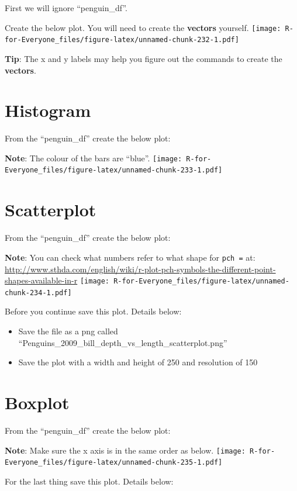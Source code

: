 \documentclass[]{book}
\providecommand{\tightlist}{%
  \setlength{\itemsep}{0pt}\setlength{\parskip}{0pt}}
\begin{document}
First we will ignore ``penguin\_df''.

Create the below plot. You will need to create the \textbf{vectors}
yourself.
\texttt{[image: R-for-Everyone\_files/figure-latex/unnamed-chunk-232-1.pdf]}

\textbf{Tip}: The x and y labels may help you figure out the commands to
create the \textbf{vectors}.

\section{Histogram}\label{histogram}

From the ``penguin\_df'' create the below plot:

\textbf{Note}: The colour of the bars are ``blue''.
\texttt{[image: R-for-Everyone\_files/figure-latex/unnamed-chunk-233-1.pdf]}

\section{Scatterplot}\label{scatterplot}

From the ``penguin\_df'' create the below plot:

\textbf{Note}: You can check what numbers refer to what shape for
\texttt{pch\ =} at:
\url{http://www.sthda.com/english/wiki/r-plot-pch-symbols-the-different-point-shapes-available-in-r}
\texttt{[image: R-for-Everyone\_files/figure-latex/unnamed-chunk-234-1.pdf]}

Before you continue save this plot. Details below:

\begin{itemize}
\tightlist
\item
  Save the file as a png called
  ``Penguins\_2009\_bill\_depth\_vs\_length\_scatterplot.png''
\item
  Save the plot with a width and height of 250 and resolution of 150
\end{itemize}

\section{Boxplot}\label{boxplot}

From the ``penguin\_df'' create the below plot:

\textbf{Note}: Make sure the x axis is in the same order as below.
\texttt{[image: R-for-Everyone\_files/figure-latex/unnamed-chunk-235-1.pdf]}

For the last thing save this plot. Details below:
\end{document}
